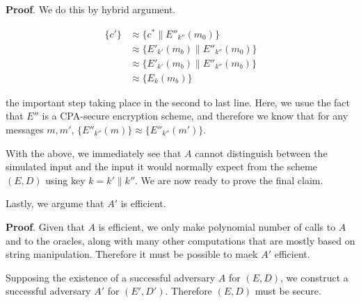 \documentclass{article}
\begin{document}
\begin{enumerate}[,label=\alph*.]
\begin{mdbmarginx}{1ex}{0pt}{1ex}{0pt}%
\noindent{}\textbf{Proof}.  We do this by hybrid argument.%
\end{mdbmarginx}%
\noindent\noindent\[%
\begin{aligned}
  \{ c' \} &\approx \{ c^* \| E''_{k''}(m_0) \} \\
  &\approx \{ E'_{k'}(m_b) \| E''_{k''}(m_0) \} \\
  &\approx \{ E'_{k'}(m_b) \| E''_{k''}(m_b) \} \\
  &\approx \{ E_k(m_b) \}
\end{aligned}
\]%

the important step taking place in the second to last line. Here, we usue the fact that $E''$ is a CPA-secure
encryption scheme, and therefore we know that for any messages $m,m'$, $\{E''_{k''}(m) \} \approx \{E''_{k''}(m')\}$. 
\mdfloatright{\ensuremath{\Box}}%

With the above, we immediately see that $A$ cannot distinguish between the simulated input
and the input it would normally expect from the scheme $(E,D)$ using key $k = k' \| k''$. We are now
ready to prove the final claim.%

Lastly, we argume that $A'$ is efficient.%

\begin{mdbmarginx}{1ex}{0pt}{1ex}{0pt}%
\noindent{}\textbf{Proof}.   Given that $A$ is efficient, we only make polynomial number of calls to $A$ and to the oracles, along
 with many other computations that are mostly based on string manipulation. Therefore it must be possible
 to maek $A'$ efficient.%
\end{mdbmarginx}%

Supposing the existence of a successful adversary $A$ for $(E,D)$, we construct a successful 
adversary $A'$ for $(E',D')$. Therefore $(E,D)$ must be secure.%


\end{enumerate}
\end{document}
